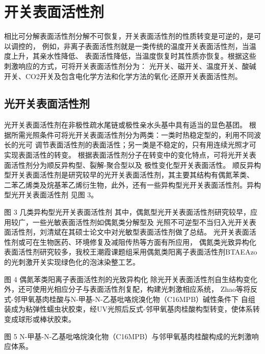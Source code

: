 \documentclass[bachelor,winfonts]{jnuthesis} %
\begin{document}
    \section{开关表面活性剂}
    相比可分解表面活性剂分解不可恢复，开关表面活性剂的性质转变是可逆的，是可以调控的，
    例如，非离子表面活性剂就是一类传统的温度开关表面活性剂，当温度上升，其亲水性降低、
    表面活性降低，当温度恢复时其性质亦恢复。根据这些刺激响应的方式，可将开关表面活性剂分为：
    光开关、磁开关、温度开关、酸碱开关、CO2开关及包含电化学方法和化学方法的氧化-还原开关表面活性剂\cite{秦勇2009}。
    
    \subsection{光开关表面活性剂}
    光开关表面活性剂在非极性疏水尾链或极性亲水头基中具有适当的显色基团\cite{张冤帝2017}。
    根据所需光照条件可将光开关表面活性剂分为两类：一类时热稳定型的，利用不同波长的光可
    调节表面活性剂的表面活性；另一类是不稳定的，只有用连续光照才可实现表面活性的转变。
    根据表面活性剂分子在转变中的变化特点，可将光开关表面活性剂分为顺反异构型、裂解-聚合型以及
    极性变化型开关表面活性\cite{张冤帝2017,李云霞2011}。
    顺反异构型开关表面活性剂是研究较早的光开关表面活性剂，其主要其结构有偶氮苯类、
    二苯乙烯类及烷基苯乙烯衍生物，此外，还有一些异构型光开关表面活性剂。异构型光开关表面活性剂
    见图 3\cite{张冤帝2017,karthaus1996,shang2003,吕湘亮2018}。
    
    图 3 几类异构型光开关表面活性剂\cite{张冤帝2017,karthaus1996,shang2003,吕湘亮2018}
    其中，偶氮型光开关表面活性剂研究较早，应用较广，一些光敏表面活性剂如偶氮类分解型及
    光照不可逆型不当归入光开关表面活性剂，刘清斌在其硕士论文中对光敏型表面活性剂做了总结\cite{刘清斌2018}。
    光开关表面活性剂或可在生物医药、环境修复及减阻传热等方面有所应用\cite{刘清斌2018}，
    偶氮类光致异构化表面活性剂研究较多，我校王潮霞课题组\cite{chen2016}采用偶氮类阳离子表面活性剂BTAEAzo的光刺激开关实现绿色化的泡沫染整工艺。
    
    图 4 偶氮苯类阳离子表面活性剂的光致异构化\cite{chen2016}
    除光开关表面活性剂自生结构变化外，还可使用光相应分子与表面活性剂复配，构建光刺激相应系统，
    Zhao等\cite{zhao2016}将反式-邻甲氧基肉桂酸与N-甲基-N-乙基吡咯烷溴化物（C16MPB）碱性条件下
    自组装成为粘弹性蠕虫状胶束，经UV光照后反式-邻甲氧基肉桂酸构型转变，使体系转变成球形或棒状胶束。
    
    图 5 N-甲基-N-乙基吡咯烷溴化物（C16MPB）与邻甲氧基肉桂酸构成的光刺激响应体系\cite{zhao2016}。
    
\end{document}
